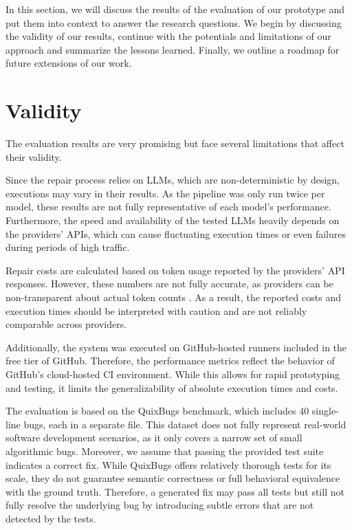 In this section, we will discuss the results of the evaluation of our prototype and put them into context to answer the research questions. We begin by discussing the validity of our results, continue with the potentials and limitations of our approach and summarize the lessons learned. Finally, we outline a roadmap for future extensions of our work.

\section{Validity} \label{section:validity}

The evaluation results are very promising but face several limitations that affect their validity.

Since the repair process relies on \acp{LLM}, which are non-deterministic by design, executions may vary in their results. As the pipeline was only run twice per model, these results are not fully representative of each model's performance. Furthermore, the speed and availability of the tested \acp{LLM} heavily depends on the providers' \acp{API}, which can cause fluctuating execution times or even failures during periods of high traffic.

Repair costs are calculated based on token usage reported by the providers' \ac{API} responses. However, these numbers are not fully accurate, as providers can be non-transparent about actual token counts \cite{sunCoInCountingInvisible2025d}. As a result, the reported costs and execution times should be interpreted with caution and are not reliably comparable across providers.

Additionally, the system was executed on GitHub-hosted runners included in the free tier of GitHub. Therefore, the performance metrics reflect the behavior of GitHub's cloud-hosted CI environment. While this allows for rapid prototyping and testing, it limits the generalizability of absolute execution times and costs.

The evaluation is based on the QuixBugs benchmark, which includes 40 single-line bugs, each in a separate file. This dataset does not fully represent real-world software development scenarios, as it only covers a narrow set of small algorithmic bugs. Moreover, we assume that passing the provided test suite indicates a correct fix. While QuixBugs offers relatively thorough tests for its scale, they do not guarantee semantic correctness or full behavioral equivalence with the ground truth. Therefore, a generated fix may pass all tests but still not fully resolve the underlying bug by introducing subtle errors that are not detected by the tests.

